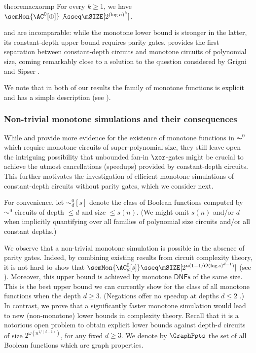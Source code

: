\documentclass[11pt]{article}
\begin{document}
\begin{restatable}{theorem}{acxormp}
    \label{thm:ac02-mp-intro}
    For every $k \geq 1$,
    we have
$\semMon{\AC^0[\oplus]} \not\sseq \mSIZE[2^{(\log n)^k}]$.
\end{restatable}

 and  are incomparable: while the monotone lower bound is stronger in the latter, its constant-depth upper bound requires parity gates.  provides the first separation between constant-depth circuits and monotone circuits of polynomial size, coming remarkably close to a solution to the question considered by Grigni and Sipser \citep{gs92}.

We note that in both of our results the family of monotone functions is explicit and has a simple description (see ).  





\subsubsection{Non-trivial monotone simulations and their consequences}

While  and  provide more 
 evidence for the existence of monotone functions in $\AC^0$
which require monotone circuits of super-polynomial size, they still leave open the
intriguing possibility that
unbounded fan-in $\xor$-gates might be crucial to achieve the utmost cancellations (speedups) provided by constant-depth circuits. This further motivates the investigation of efficient monotone simulations of constant-depth circuits without parity gates, which we consider next. 



For convenience, let $\AC^0_d[s]$ denote the class of Boolean functions
computed by $\AC^0$ circuits of depth $\leq d$ and size $\leq s(n)$. (We
might omit $s(n)$ and/or $d$ when implicitly quantifying over all families
of polynomial size circuits and/or all constant depths.) 


We observe that a non-trivial monotone simulation is possible in the absence of parity
gates. Indeed, by combining existing results from circuit complexity theory, it is not hard to show that
$\semMon{\AC^0_d[s]} 
\sseq 
\mSIZE[2^{n(1-{1/O(\log s)^{d-1}})}]$ (see ).
Moreover, this upper bound is achieved by monotone $\mathsf{DNFs}$ of the same size. This is the best upper bound we can currently show for the class of all
monotone functions when the depth $d \geq 3$. (Negations offer no speedup
at depths $d \leq 2$ \citep{quine_1953}.) In contrast, we prove that a
significantly faster monotone simulation would lead to new (non-monotone)
lower bounds in  complexity theory. Recall that it is a notorious open
problem to obtain explicit lower bounds against depth-$d$ circuits of size
$2^{\omega(n^{1/(d-1)})}$, for any fixed $d \geq 3$.
We denote by $\GraphPpts$ the set of all 
Boolean functions which are graph properties. 
\end{document}
